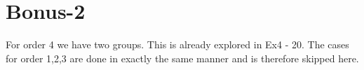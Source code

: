\section*{Bonus-2}
For order 4 we have two groups. This is already explored in Ex4 - 20. The cases for order 1,2,3 are done in exactly the same manner and is therefore skipped here.